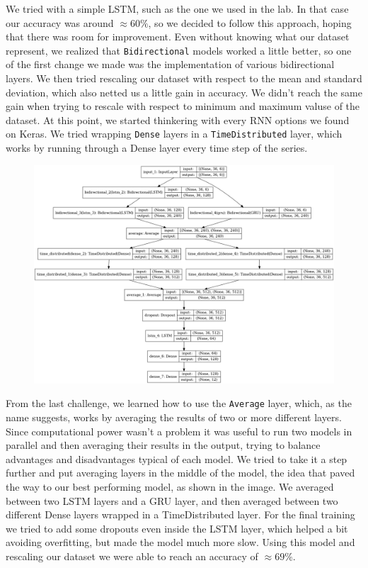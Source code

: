 \documentclass[a4paper,11pt]{article}
\newcommand{\code}[1]{\texttt{#1}}
\numberwithin{equation}{section}
\begin{document}
We tried with a simple LSTM, such as the one we used in the lab. In that case our accuracy was around \(\approx 60\%\), so we decided to follow this approach, hoping that there was room for improvement. Even without knowing what our dataset represent, we realized that \code{Bidirectional} models worked a little better, so one of the first change we made was the implementation of various bidirectional layers. We then tried rescaling our dataset with respect to the mean and standard deviation, which also netted us a little gain in accuracy. We didn't reach the same gain when trying to rescale with respect to minimum and maximum valuse of the dataset. At this point, we started thinkering with every RNN options we found on Keras. We tried wrapping \code{Dense} layers in a \code{TimeDistributed} layer, which works by running through a Dense layer every time step of the series. 
\begin{figure}
    \includegraphics*[scale=0.145]{model_final.png}
\end{figure}
\noindent From the last challenge, we learned how to use the \code{Average} layer, which, as the name suggests, works by averaging the results of two or more different layers. Since computational power wasn't a problem it was useful to run two models in parallel and then averaging their results in the output, trying to balance advantages and disadvantages typical of each model. We tried to take it a step further and put averaging layers in the middle of the model, the idea that paved the way to our best performing model, as shown in the image. We averaged between two LSTM layers and a GRU layer, and then averaged between two different Dense layers wrapped in a TimeDistributed layer. For the final training we tried to add some dropouts even inside the LSTM layer, which helped a bit avoiding overfitting, but made the model much more slow. Using this model and rescaling our dataset we were able to reach an accuracy of \(\approx 69\%\).
\end{document}
